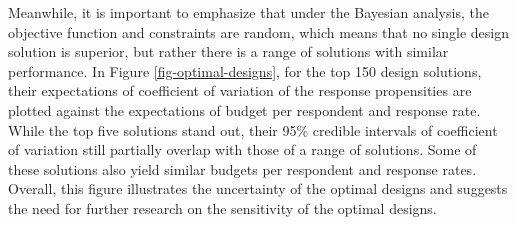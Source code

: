 \documentclass[12pt]{article}
\makeatletter
\def\fixFloatSize#1{}%
\makeatother
\begin{document}
Meanwhile, it is important to emphasize that under the Bayesian analysis, the objective function and constraints are random, which means that no single design solution is superior, but rather there is a range of solutions with similar performance.
In Figure \ref{fig-optimal-designs}, for the top 150 design solutions, their expectations of coefficient of variation of the response propensities are plotted against the expectations of budget per respondent and response rate.
While the top five solutions stand out, their 95\% credible intervals of coefficient of variation still partially overlap with those of a range of solutions.
Some of these solutions also yield similar budgets per respondent and response rates.
Overall, this figure illustrates the uncertainty of the optimal designs and suggests the need for further research on the sensitivity of the optimal designs.
\bgroup
\end{document}
